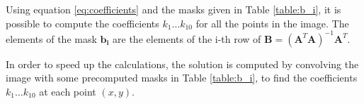 \documentclass{ipol}
\numberwithin{equation}{section}
\numberwithin{table}{section}
\begin{document}
Using equation \ref{eq:coefficients} and the masks given in Table \ref{table:b_i}, it is possible to compute 
the coefficients $k_1 \hdots k_{10}$ for all the points in the image. The elements of the mask $\mathbf{b_i}$ 
are the elements of the i-th row of $\mathbf{B} = (\mathbf{A}^T\mathbf{A})^{-1}\mathbf{A}^T$.

In order to speed up the calculations, the solution is computed by convolving the image with some precomputed 
masks in Table \ref{table:b_i}, to find the coefficients $k_1\dots k_{10}$ at each point $(x,y)$. 

\begin{table}
\centering
{}
\qquad\qquad
{} \\
\qquad\qquad
{}
\end{table}
\end{document}
